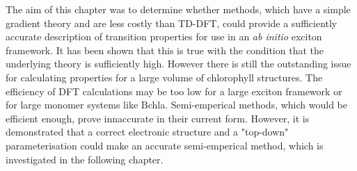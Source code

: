 The aim of this chapter was to determine whether \dscf methods, which have a simple
gradient theory and are less costly than TD-DFT, could provide a sufficiently accurate
description of transition properties for use in an \emph{ab initio} exciton framework.
It has been shown that this is true with the condition that the underlying theory
is sufficiently high. However there is still the outstanding issue for calculating
properties for a large volume of  chlorophyll structures. The efficiency of DFT calculations 
may be too low for a large exciton framework or for large monomer systems like Bchla.
Semi-emperical \dscf methods, which would be efficient enough, prove innaccurate 
in their current form. However, it is demonstrated that a correct electronic structure
and a "top-down" parameterisation could make an accurate semi-emperical method, 
which is investigated in the following chapter.
